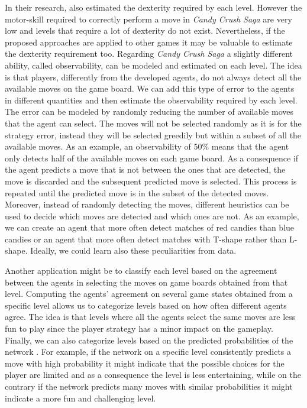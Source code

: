 In their research, \textcite{isaksen_simulating_2017} also estimated the dexterity required by each level. However the motor-skill required to correctly perform a move in \textit{Candy Crush Saga} are very low and levels that require a lot of dexterity do not exist. Nevertheless, if the proposed approaches are applied to other games it may be valuable to estimate the dexterity requirement too. Regarding \textit{Candy Crush Saga} a slightly different ability, called observability, can be modeled and estimated on each level. The idea is that players, differently from the developed agents, do not always detect all the available moves on the game board. We can add this type of error to the agents in different quantities and then estimate the observability required by each level. The error can be modeled by randomly reducing the number of available moves that the agent can select. The moves will not be selected randomly as it is for the strategy error, instead they will be selected greedily but within a subset of all the available moves. As an example, an observability of 50\% means that the agent only detects half of the available moves on each game board. As a consequence if the agent predicts a move that is not between the ones that are detected, the move is discarded and the subsequent predicted move is selected. This process is repeated until the predicted move is in the subset of the detected moves. Moreover, instead of randomly detecting the moves, different heuristics can be used to decide which moves are detected and which ones are not. As an example, we can create an agent that more often detect matches of red candies than blue candies or an agent that more often detect matches with T-shape rather than L-shape. Ideally, we could learn also these peculiarities from data.

Another application might be to classify each level based on the agreement between the agents in selecting the moves on game boards obtained from that level.
Computing the agents' agreement on several game states obtained from a specific level allows us to categorize levels based on how often different agents agree. The idea is that levels where all the agents select the same moves are less fun to play since the player strategy has a minor impact on the gameplay.
Finally, we can also categorize levels based on the predicted probabilities of the network \cite{costa_probabilistic_1996}. For example, if the network on a specific level consistently predicts a move with high probability it might indicate that the possible choices for the player are limited and as a consequence the level is less entertaining, while on the contrary if the network predicts many moves with similar probabilities it might indicate a more fun and challenging level.


